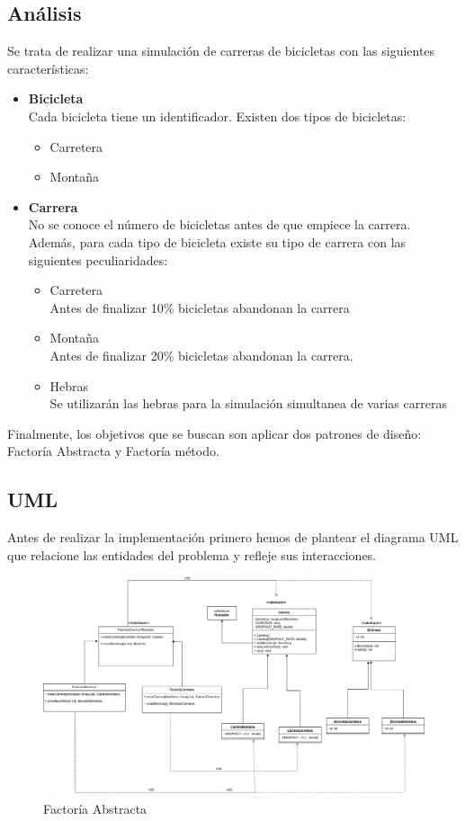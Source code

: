 \documentclass{article}
\begin{document}
	\subsection{Análisis}
	\noindent Se trata de realizar una simulación de carreras de bicicletas con las siguientes características:
	\begin{itemize}
		\item \textbf{Bicicleta}\\
		Cada bicicleta tiene un identificador. Existen dos tipos de bicicletas:
		\begin{itemize}
			\item Carretera
			\item Montaña
		\end{itemize}
		

			\item \textbf{Carrera}\\
			No se conoce el número de bicicletas antes de que empiece la carrera. Además, para cada tipo de bicicleta existe su tipo de carrera con las siguientes peculiaridades:
			\begin{itemize}
				\item Carretera\\
				Antes de finalizar 10\% bicicletas abandonan la carrera
				\item Montaña\\
				Antes de finalizar 20\% bicicletas abandonan la carrera.
				\item Hebras\\
				Se utilizarán las hebras para la simulación simultanea de varias carreras
		\end{itemize}
\end{itemize}

\noindent Finalmente, los objetivos que se buscan son aplicar dos patrones de diseño: Factoría Abstracta y Factoría método.


\subsection{UML}
Antes de realizar la implementación primero hemos de plantear el diagrama UML que relacione las entidades del problema y refleje sus interacciones.
\begin{figure}[h]
	\centering
	\includegraphics[width=1\textwidth]{DS_ej1.drawio.png}
	\caption{Factoría Abstracta}
	\label{fig:factoria_abstracta}
\end{figure}
\end{document}
